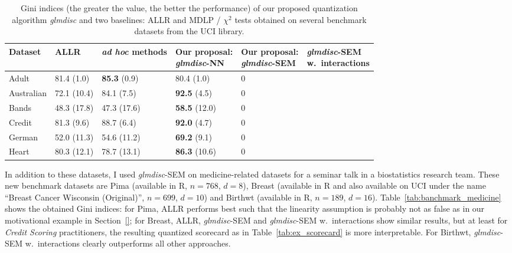 \begin{table}
    \centering
        \caption{Gini indices (the greater the value, the better the performance) of our proposed quantization algorithm \textit{glmdisc} and two baselines: ALLR and MDLP / $\chi^2$ tests obtained on several benchmark datasets from the UCI library.}
    \label{tab:banchmark_inter}
\begin{small}
\begin{tabular}{llllll}
Dataset & ALLR & \textit{ad hoc} methods & \makecell{Our proposal:\\ \textit{glmdisc}-NN} & \makecell{Our proposal:\\ \textit{glmdisc}-SEM} & \makecell{\textit{glmdisc}-SEM\\ w.\ interactions} \\
\hline
Adult & 81.4 (1.0) & \textbf{85.3} (0.9) & 80.4 (1.0) & 0 & \\
Australian & 72.1 (10.4) & 84.1 (7.5) & \textbf{92.5} (4.5) & 0 & \\
Bands & 48.3 (17.8) & 47.3 (17.6) & \textbf{58.5} (12.0) & 0 & \\
Credit & 81.3 (9.6) & 88.7 (6.4) & \textbf{92.0} (4.7) & 0 & \\
German & 52.0 (11.3) & 54.6 (11.2) & \textbf{69.2} (9.1) & 0 & \\
Heart & 80.3 (12.1) & 78.7 (13.1) & \textbf{86.3} (10.6) & 0 & 
\end{tabular}
\end{small}
\end{table}


In addition to these datasets, I used \textit{glmdisc}-SEM on medicine-related datasets for a seminar talk in a biostatistics research team. These new benchmark datasets are Pima (available in \textsf{R}, $n=768$, $d=8$), Breast (available in \textsf{R} and also available on UCI under the name ``Breast Cancer Wisconsin (Original)'', $n=699$, $d=10$) and Birthwt (available in \textsf{R}, $n=189$, $d=16$). Table~\ref{tab:banchmark_medicine} shows the obtained Gini indices: for Pima, ALLR performs best such that the linearity assumption is probably not as false as in our motivational example in Section~\ref{}; for Breast, ALLR, \textit{glmdisc}-SEM and \textit{glmdisc}-SEM w.\ interactions show similar results, but at least for \textit{Credit Scoring} practitioners, the resulting quantized scorecard as in Table~\ref{tab:ex_scorecard} is more interpretable. For Birthwt, \textit{glmdisc}-SEM w.\ interactions clearly outperforms all other approaches.

